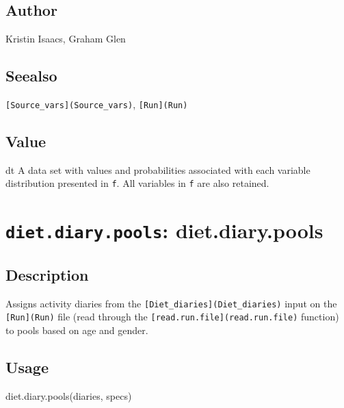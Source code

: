 \documentclass[
]{article}
\newenvironment{Shaded}{\begin{snugshade}}{\end{snugshade}}
\newcommand{\FunctionTok}[1]{\textcolor[rgb]{0.00,0.00,0.00}{#1}}
\newcommand{\NormalTok}[1]{#1}
\begin{document}
\hypertarget{author-7}{%
\subsection{Author}\label{author-7}}

Kristin Isaacs, Graham Glen

\hypertarget{seealso-6}{%
\subsection{Seealso}\label{seealso-6}}

\texttt{{[}Source\_vars{]}(Source\_vars)}, \texttt{{[}Run{]}(Run)}

\hypertarget{value-7}{%
\subsection{Value}\label{value-7}}

dt A data set with values and probabilities associated with each
variable distribution presented in \texttt{f}. All variables in
\texttt{f} are also retained.

\hypertarget{diet.diary.pools-diet.diary.pools}{%
\section{\texorpdfstring{\texttt{diet.diary.pools}:
diet.diary.pools}{diet.diary.pools: diet.diary.pools}}\label{diet.diary.pools-diet.diary.pools}}

\hypertarget{description-12}{%
\subsection{Description}\label{description-12}}

Assigns activity diaries from the
\texttt{{[}Diet\_diaries{]}(Diet\_diaries)} input on the
\texttt{{[}Run{]}(Run)} file (read through the
\texttt{{[}read.run.file{]}(read.run.file)} function) to pools based on
age and gender.

\hypertarget{usage-12}{%
\subsection{Usage}\label{usage-12}}

\begin{Shaded}
\begin{Highlighting}[]
\FunctionTok{diet.diary.pools}\NormalTok{(diaries, specs)}
\end{Highlighting}
\end{Shaded}
\end{document}

